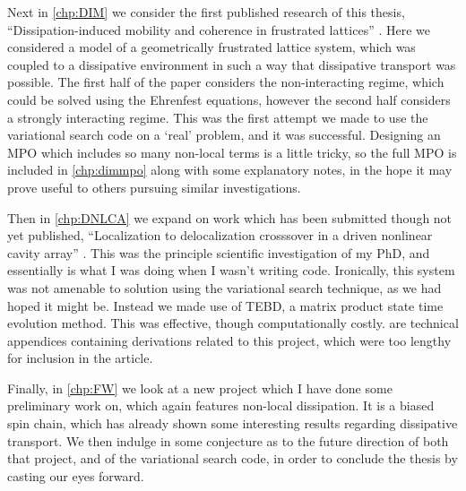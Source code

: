 Next in \cref{chp:DIM} we consider the first published research of this thesis, ``Dissipation-induced mobility and coherence in frustrated lattices'' \cite{Owen2017}. Here we considered a model of a geometrically frustrated lattice system, which was coupled to a dissipative environment in such a way that dissipative transport was possible. The first half of the paper considers the non-interacting regime, which could be solved using the Ehrenfest equations, however the second half considers a strongly interacting regime. This was the first attempt we made to use the variational search code on a `real' problem, and it was successful. Designing an MPO which includes so many non-local terms is a little tricky, so the full MPO is included in \cref{chp:dimmpo} along with some explanatory notes, in the hope it may prove useful to others pursuing similar investigations.

Then in \cref{chp:DNLCA} we expand on work which has been submitted though not yet published, ``Localization to delocalization crosssover in a driven nonlinear cavity array'' \cite{Brown2018}. This was the principle scientific investigation of my PhD, and essentially is what I was doing when I wasn't writing code. Ironically, this system was not amenable to solution using the variational search technique, as we had hoped it might be. Instead we made use of TEBD, a matrix product state time evolution method. This was effective, though computationally costly.  are technical appendices containing derivations related to this project, which were too lengthy for inclusion in the article.

Finally, in \cref{chp:FW} we look at a new project which I have done some preliminary work on, which again features non-local dissipation. It is a biased spin chain, which has already shown some interesting results regarding dissipative transport. We then indulge in some conjecture as to the future direction of both that project, and of the variational search code, in order to conclude the thesis by casting our eyes forward. 